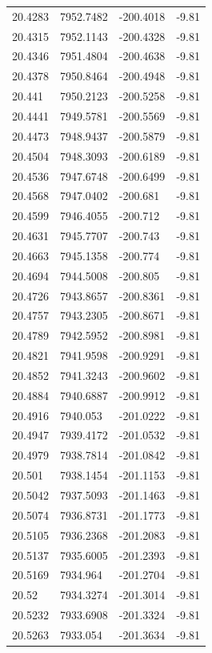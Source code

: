 \begin{table}[H]
\begin{tabular}{llll}
20.4283 & 7952.7482 & -200.4018 & -9.81 \\
20.4315 & 7952.1143 & -200.4328 & -9.81 \\
20.4346 & 7951.4804 & -200.4638 & -9.81 \\
20.4378 & 7950.8464 & -200.4948 & -9.81 \\
20.441 & 7950.2123 & -200.5258 & -9.81 \\
20.4441 & 7949.5781 & -200.5569 & -9.81 \\
20.4473 & 7948.9437 & -200.5879 & -9.81 \\
20.4504 & 7948.3093 & -200.6189 & -9.81 \\
20.4536 & 7947.6748 & -200.6499 & -9.81 \\
20.4568 & 7947.0402 & -200.681 & -9.81 \\
20.4599 & 7946.4055 & -200.712 & -9.81 \\
20.4631 & 7945.7707 & -200.743 & -9.81 \\
20.4663 & 7945.1358 & -200.774 & -9.81 \\
20.4694 & 7944.5008 & -200.805 & -9.81 \\
20.4726 & 7943.8657 & -200.8361 & -9.81 \\
20.4757 & 7943.2305 & -200.8671 & -9.81 \\
20.4789 & 7942.5952 & -200.8981 & -9.81 \\
20.4821 & 7941.9598 & -200.9291 & -9.81 \\
20.4852 & 7941.3243 & -200.9602 & -9.81 \\
20.4884 & 7940.6887 & -200.9912 & -9.81 \\
20.4916 & 7940.053 & -201.0222 & -9.81 \\
20.4947 & 7939.4172 & -201.0532 & -9.81 \\
20.4979 & 7938.7814 & -201.0842 & -9.81 \\
20.501 & 7938.1454 & -201.1153 & -9.81 \\
20.5042 & 7937.5093 & -201.1463 & -9.81 \\
20.5074 & 7936.8731 & -201.1773 & -9.81 \\
20.5105 & 7936.2368 & -201.2083 & -9.81 \\
20.5137 & 7935.6005 & -201.2393 & -9.81 \\
20.5169 & 7934.964 & -201.2704 & -9.81 \\
20.52 & 7934.3274 & -201.3014 & -9.81 \\
20.5232 & 7933.6908 & -201.3324 & -9.81 \\
20.5263 & 7933.054 & -201.3634 & -9.81 \\

\end{tabular}
\end{table}
